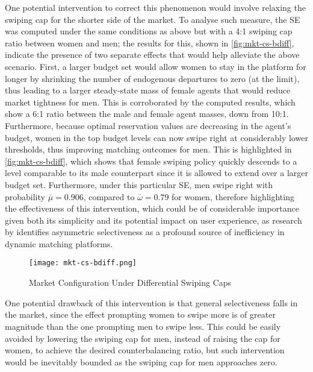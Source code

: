 One potential intervention to correct this phenomenon would involve relaxing the swiping cap for the shorter side of the market.
To analyse such measure, the SE was computed under the same conditions as above but with a 4:1 swiping cap ratio between women and men; the results for this, shown in \autoref{fig:mkt-cs-bdiff}, indicate the presence of two separate effects that would help alleviate the above scenario. 
First, a larger budget set would allow women to stay in the platform for longer by shrinking the number of endogenous departures to zero (at the limit), thus leading to a larger steady-state mass of female agents that would reduce market tightness for men. 
This is corroborated by the computed results, which show a 6:1 ratio between the male and female agent masses, down from 10:1. 
Furthermore, because optimal reservation values are decreasing in the agent's budget, women in the top budget levels can now swipe right at considerably lower thresholds, thus improving matching outcomes for men. 
This is highlighted in \autoref{fig:mkt-cs-bdiff}, which shows that female swiping policy quickly descends to a level comparable to its male counterpart since it is allowed to extend over a larger budget set. 
Furthermore, under this particular SE, men swipe right with probability $\overline\mu=0.906$, compared to $\overline\omega=0.79$ for women, therefore highlighting the effectiveness of this intervention, which could be of considerable importance given both its simplicity and its potential impact on user experience, as research by \cite{kanoria2021facilitating} identifies asymmetric selectiveness as a profound source of inefficiency in dynamic matching platforms. 
\begin{figure}[ht]
    \centering
    \caption{Market Configuration Under Differential Swiping Caps}
    \texttt{[image: mkt-cs-bdiff.png]}
    \label{fig:mkt-cs-bdiff} 
\end{figure}
One potential drawback of this intervention is that general selectiveness falls in the market, since the effect prompting women to swipe more is of greater magnitude than the one prompting men to swipe less. 
This could be easily avoided by lowering the swiping cap for men, instead of raising the cap for women, to achieve the desired counterbalancing ratio, but such intervention would be inevitably bounded as the swiping cap for men approaches zero.
